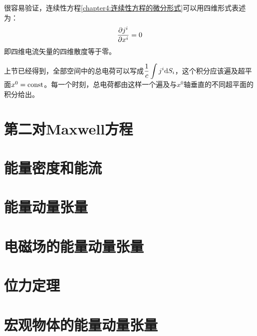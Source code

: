 很容易验证，连续性方程\eqref{chapter4:连续性方程的微分形式}可以用四维形式表述为：
\begin{equation}
	\frac{\partial j^i}{\partial x^i} = 0
	\label{chapter4:连续性方程的四维形式}
\end{equation}
即四维电流矢量的四维散度等于零。

上节已经得到，全部空间中的总电荷可以写成$\displaystyle \frac1c \int j^i\mathrm{d} S_i$，这个积分应该遍及超平面$x^0=\text{const}$。每一个时刻，总电荷都由这样一个遍及与$x^0$轴垂直的不同超平面的积分给出。

\section{第二对Maxwell方程}

\section{能量密度和能流}

\section{能量动量张量}

\section{电磁场的能量动量张量}

\section{位力定理}

\section{宏观物体的能量动量张量}
